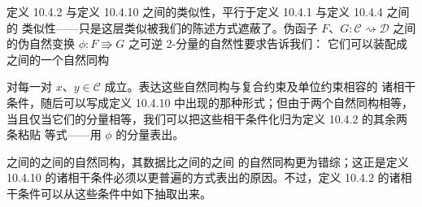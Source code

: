 \begin{remark}\label{rem:analogy-pseudonatural-quasi}
定义 10.4.2 与定义 10.4.10 之间的类似性，平行于定义 10.4.1 与定义 10.4.4 之间的
类似性——只是这层类似被我们的陈述方式遮蔽了。伪函子 $F$、$G\colon\mathcal{C}\rightsquigarrow\mathcal{D}$
之间的伪自然变换 $\phi\colon F\Rrightarrow G$ 之可逆 2-\trCell{}分量的自然性要求告诉我们：
它们可以装配成\trFunctor{}之间的一个自然同构
\begin{center}
\end{center}
对每一对 $x$、$y\in\mathcal{C}$ 成立。表达这些自然同构与复合约束及单位约束相容的
诸相干条件，随后可以写成定义 10.4.10 中出现的那种形式；但由于两个自然同构相等，
当且仅当它们的分量相等，我们可以把这些相干条件化归为定义 10.4.2 的其余两条粘贴
等式——用 $\phi$ 的分量表出。

\trQuasiCategory{}之间的\trFunctor{}之间的自然同构，其数据比\trCategory{}之间的\trFunctor{}之间
的自然同构更为错综；这正是定义 10.4.10 的诸相干条件必须以更普遍的方式表出的原因。不过，定义 10.4.2 的诸相干条件可以从这些条件中如下抽取出来。


\end{remark}
